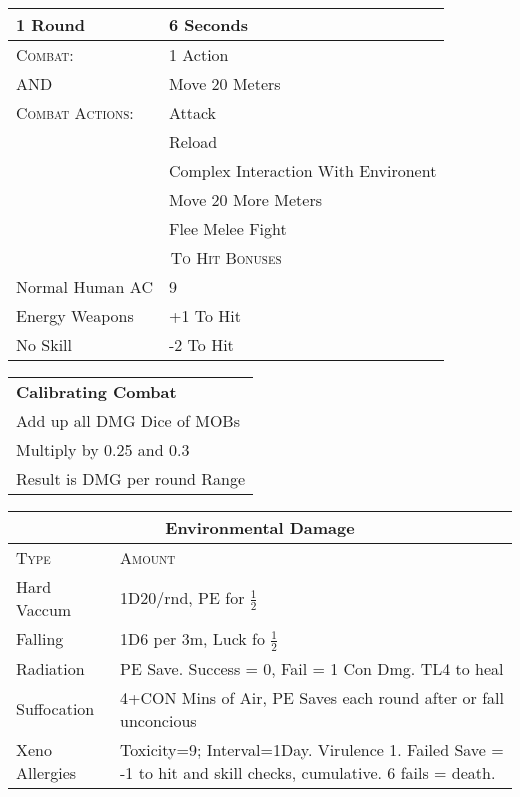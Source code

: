 \documentclass[10pt,letterpaper]{article}
\begin{document}
\begin{multicols}{3}
\begin{tabularx}{\columnwidth}{ | X | X | }
        \hline
        1 Round & 6 Seconds \\
        \hline
        \textsc{Combat:} & 1 Action \\
        \hline
         AND & Move 20 Meters \\
        \hline
         \textsc{Combat Actions:} & Attack \\
        \hline
          & Reload \\
        \hline
          & Complex Interaction With Environent \\
        \hline
          & Move 20 More Meters \\
        \hline
          & Flee Melee Fight \\
        \hline
        \multicolumn{2}{|c|}{\textsc{To Hit Bonuses}} \\
        \hline
        Normal Human AC & 9 \\
        \hline
        Energy Weapons & +1 To Hit \\
        \hline
        No Skill & -2 To Hit \\
        \hline
    \end{tabularx}
    \begin{tabularx}{\columnwidth}{| X |}
        \hline
        \textbf{Calibrating Combat} \\
        Add up all DMG Dice of MOBs \\
        Multiply by 0.25 and 0.3 \\
        Result is DMG per round Range \\
        \hline
    \end{tabularx}
    \begin{tabularx}{\columnwidth}{| l | X |}
        \hline
        \multicolumn{2}{|c|}{\textbf{Environmental Damage}} \\
        \hline
        \textsc{Type} & \textsc{Amount} \\
        \hline
        Hard Vaccum & 1D20/rnd, PE for $\frac{1}{2}$ \\
        \hline
        Falling & 1D6 per 3m, Luck fo $\frac{1}{2}$ \\
        \hline
        Radiation & PE Save. Success = 0, Fail = 1 Con Dmg. TL4 to heal \\
        \hline
        Suffocation & 4+CON Mins of Air, PE Saves each round after or fall unconcious \\
        \hline
        Xeno Allergies & Toxicity=9; Interval=1Day. Virulence 1. Failed Save = -1 to hit and skill checks, cumulative. 6 fails = death. \\

\end{tabularx}
\end{multicols}
\end{document}

